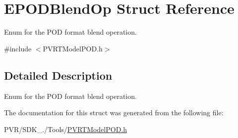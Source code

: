 \hypertarget{struct_e_p_o_d_blend_op}{\section{E\+P\+O\+D\+Blend\+Op Struct Reference}
\label{struct_e_p_o_d_blend_op}
}


Enum for the P\+O\+D format blend operation.  




{\ttfamily \#include $<$P\+V\+R\+T\+Model\+P\+O\+D.\+h$>$}



\subsection{Detailed Description}
Enum for the P\+O\+D format blend operation. 



 

The documentation for this struct was generated from the following file\+:\begin{DoxyCompactItemize}
\item 
P\+V\+R/\+S\+D\+K\+\_./\+Tools/\hyperlink{_p_v_r_t_model_p_o_d_8h}{P\+V\+R\+T\+Model\+P\+O\+D.\+h}\end{DoxyCompactItemize}
